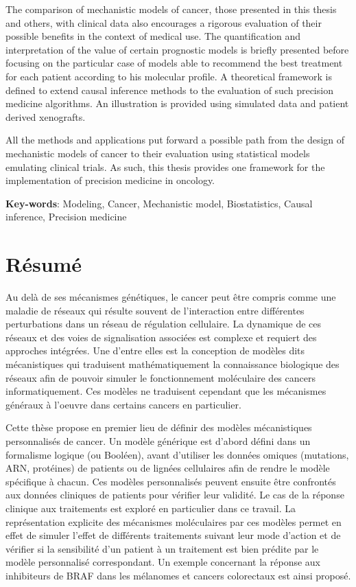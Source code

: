 \documentclass[a4paper,12pt,twoside,onecolumn,openright,final,oldfontcommands]{memoir}
\newcommand{\initial}[1]{
	\lettrine[lines=3,lhang=0.33,nindent=0em]{
		\color{gray}
     		{\textsc{#1}}}{}}
\begin{document}
The comparison of mechanistic models of cancer, those presented in this
thesis and others, with clinical data also encourages a rigorous
evaluation of their possible benefits in the context of medical use. The
quantification and interpretation of the value of certain prognostic
models is briefly presented before focusing on the particular case of
models able to recommend the best treatment for each patient according
to his molecular profile. A theoretical framework is defined to extend
causal inference methods to the evaluation of such precision medicine
algorithms. An illustration is provided using simulated data and patient
derived xenografts.

All the methods and applications put forward a possible path from the
design of mechanistic models of cancer to their evaluation using
statistical models emulating clinical trials. As such, this thesis
provides one framework for the implementation of precision medicine in
oncology.

\vspace{\baselineskip}

\textbf{Key-words}: Modeling, Cancer, Mechanistic model, Biostatistics,
Causal inference, Precision medicine

\chapter*{Résumé}

\initial{A}u delà de ses mécanismes génétiques, le cancer peut être
compris comme une maladie de réseaux qui résulte souvent de
l'interaction entre différentes perturbations dans un réseau de
régulation cellulaire. La dynamique de ces réseaux et des voies de
signalisation associées est complexe et requiert des approches
intégrées. Une d'entre elles est la conception de modèles dits
mécanistiques qui traduisent mathématiquement la connaissance biologique
des réseaux afin de pouvoir simuler le fonctionnement moléculaire des
cancers informatiquement. Ces modèles ne traduisent cependant que les
mécanismes généraux à l'oeuvre dans certains cancers en particulier.

Cette thèse propose en premier lieu de définir des modèles mécanistiques
personnalisés de cancer. Un modèle générique est d'abord défini dans un
formalisme logique (ou Booléen), avant d'utiliser les données omiques
(mutations, ARN, protéines) de patients ou de lignées cellulaires afin
de rendre le modèle spécifique à chacun. Ces modèles personnalisés
peuvent ensuite être confrontés aux données cliniques de patients pour
vérifier leur validité. Le cas de la réponse clinique aux traitements
est exploré en particulier dans ce travail. La représentation explicite
des mécanismes moléculaires par ces modèles permet en effet de simuler
l'effet de différents traitements suivant leur mode d'action et de
vérifier si la sensibilité d'un patient à un traitement est bien prédite
par le modèle personnalisé correspondant. Un exemple concernant la
réponse aux inhibiteurs de BRAF dans les mélanomes et cancers
colorectaux est ainsi proposé.
\end{document}
